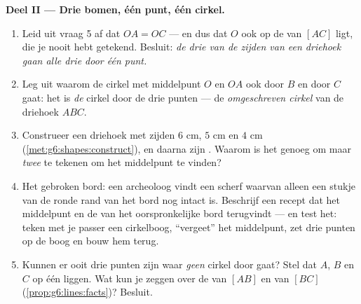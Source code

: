 \begin{problem}
\medskip
\noindent\textbf{Deel II --- Drie bomen, één punt, één cirkel.}
\begin{enumerate}[resume]
  \item Leid uit vraag 5 af dat $OA = OC$ --- en dus dat $O$ ook op de
         van $[AC]$ ligt, die je nooit hebt getekend. Besluit:
        \emph{de drie  van de zijden van een driehoek gaan alle
        drie door één punt.}
  \item Leg uit waarom de cirkel met middelpunt $O$ en  $OA$ ook door $B$
        en door $C$ gaat: het is \emph{de} cirkel door de drie punten --- de
        \emph{omgeschreven cirkel} van de driehoek
        $ABC$.
  \item Construeer een driehoek met zijden $6$ cm, $5$ cm en $4$ cm
        (\cref{met:g6:shapes:construct}), en daarna zijn .
        Waarom is het genoeg om maar \emph{twee}  te tekenen om
        het middelpunt te vinden?
  \item Het gebroken bord: een archeoloog vindt een scherf waarvan alleen een
        stukje van de ronde rand van het bord nog intact is. Beschrijf een recept
        dat het middelpunt en de  van het oorspronkelijke bord terugvindt
        --- en test het: teken met je passer een cirkelboog, ``vergeet'' het
        middelpunt, zet drie punten op de boog en bouw hem terug.
  \item Kunnen er ooit drie punten zijn waar \emph{geen} cirkel door gaat? Stel
        dat $A$, $B$ en $C$ op één  liggen. Wat kun je zeggen over de
         van $[AB]$ en van $[BC]$
        (\cref{prop:g6:lines:facts})? Besluit.
\end{enumerate}


\end{problem}

